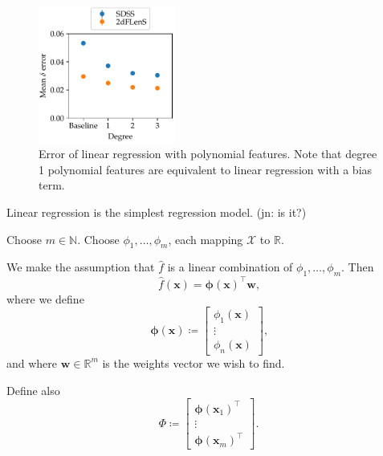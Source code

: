 \documentclass[11pt,twoside]{report}
\newcommand\bw{\mathbf{w}}
\newcommand\bx{\mathbf{x}}
\newcommand\bphi{\bm{\phi}}
\newcommand\bbN{\mathbb{N}}
\newcommand\bbR{\mathbb{R}}
\newcommand\cX{\mathcal{X}}
\newcommand\jn[1]{{\color{red}(jn: #1)}}
\begin{document}
  \begin{figure}
    \centering
    \includegraphics[width=0.4\textwidth]{linreg_polynomial.pdf}
    \caption{Error of linear regression with polynomial features. Note that degree 1 polynomial features are equivalent to linear regression with a bias term.}
    \label{fig:linreg_polynomial}
  \end{figure}

Linear regression is the simplest regression model. \jn{is it?}

Choose $m \in \bbN$. Choose $\phi_1, \dots, \phi_m$, each mapping $\cX$ to $\bbR$.

We make the assumption that $\hat f$ is a linear combination of $\phi_1, \dots, \phi_m$. Then \[
    \hat f(\bx) = \bphi(\bx)^\top \bw \text{,}
\] where we define \[
    \bphi(\bx) \coloneqq \begin{bmatrix} \phi_1(\bx) \\ \vdots \\ \phi_n(\bx) \end{bmatrix}\text{,}
\] and where $\bw \in \bbR^m$ is the weights vector we wish to find.

Define also\[
    \Phi \coloneqq \begin{bmatrix}
        \bphi(\bx_1)^\top \\
        \vdots \\
        \bphi(\bx_m)^\top
    \end{bmatrix} \text{.}
\]
\end{document}
